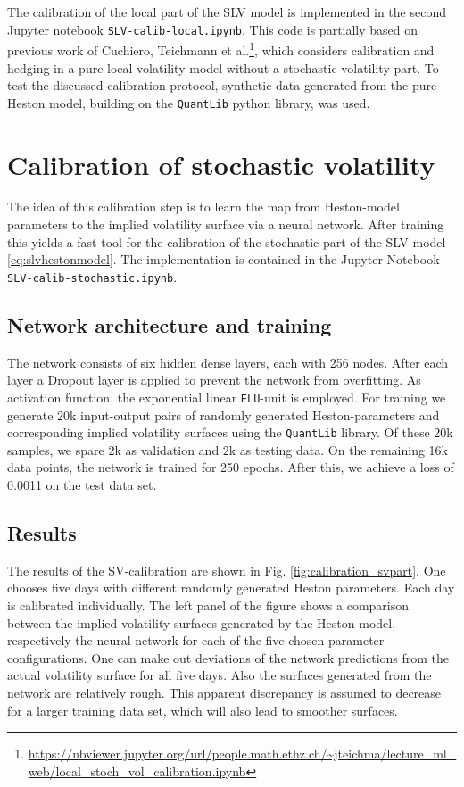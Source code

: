 \documentclass[
a4paper,     %
12pt           %
]{scrartcl}  %
\numberwithin{equation}{section}
\begin{document}
The calibration of the local part of the SLV model is implemented in the second Jupyter notebook \texttt{SLV-calib-local.ipynb}. This code is partially based on previous work of Cuchiero, Teichmann et al.\footnote{\url{https://nbviewer.jupyter.org/url/people.math.ethz.ch/~jteichma/lecture_ml_web/local_stoch_vol_calibration.ipynb}}, which considers calibration and hedging in a pure local volatility model without a stochastic volatility part. To test the discussed calibration protocol, synthetic data generated from the pure Heston model, building on the \texttt{QuantLib} python library, was used.


\section{Calibration of stochastic volatility}\label{sec:calibSV}

The idea of this calibration step is to learn the map from Heston-model parameters to the implied volatility surface via a neural network. After training this yields a fast tool for the calibration of the stochastic part of the SLV-model \eqref{eq:slvhestonmodel}. The implementation is contained in the Jupyter-Notebook \texttt{SLV-calib-stochastic.ipynb}.

\subsection{Network architecture and training}
The network consists of six hidden dense layers, each with 256 nodes. After each layer a Dropout layer is applied to prevent the network from overfitting. As activation function, the exponential linear \texttt{ELU}-unit is employed. For training we generate 20k input-output pairs of randomly generated Heston-parameters and corresponding implied volatility surfaces using the \texttt{QuantLib} library. Of these 20k samples, we spare 2k as validation and 2k as testing data. On the remaining 16k data points, the network is trained for 250 epochs. After this, we achieve a loss of 0.0011 on the test data set.


\subsection{Results}
The results of the SV-calibration are shown in Fig. \ref{fig:calibration_svpart}. One chooses five days with different randomly generated Heston parameters. Each day is calibrated individually. The left panel of the figure shows a comparison between the implied volatility surfaces generated by the Heston model, respectively the neural network for each of the five chosen parameter configurations. One can make out deviations of the network predictions from the actual volatility surface for all five days. Also the surfaces generated from the network are relatively rough. This apparent discrepancy is assumed to decrease for a larger training data set, which will also lead to smoother surfaces.
\end{document}
